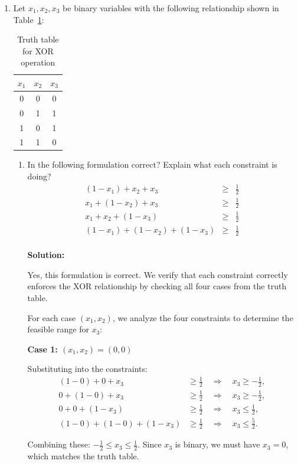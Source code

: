 \documentclass{article}
\begin{document}
\begin{enumerate}
 \item Let $x_1, x_2, x_3$ be binary variables with the following relationship shown in Table~\ref{tab:xor}:
 \begin{table}[h!]
\centering
\begin{tabular}{|c|c|c|}
\hline
\( x_1 \) & \( x_2 \) & \( x_3  \) \\
\hline
0 & 0 & 0 \\
0 & 1 & 1 \\
1 & 0 & 1 \\
1 & 1 & 0 \\
\hline
\end{tabular}
\caption{Truth table for XOR operation}
\label{tab:xor}
\end{table}
\begin{enumerate}
\item In the following formulation correct? Explain what each constraint is doing?
\begin{eqnarray*}
(1 - x_1) + x_2 + x_3 &\geq & \frac{1}{2}\\
x_1 + (1 - x_2) + x_3 &\geq & \frac{1}{2}\\
x_1 + x_2 + (1 - x_3) & \geq & \frac{1}{2}\\
(1 - x_1) + (1 - x_2) + (1 - x_3) &\geq& \frac{1}{2}\\
\end{eqnarray*}

\textbf{Solution:}

Yes, this formulation is correct. We verify that each constraint correctly enforces the XOR relationship by checking all four cases from the truth table.

For each case $(x_1, x_2)$, we analyze the four constraints to determine the feasible range for $x_3$:

\textbf{Case 1: $(x_1, x_2) = (0, 0)$}

Substituting into the constraints:
\begin{align*}
(1 - 0) + 0 + x_3 &\geq \frac{1}{2} \quad \Rightarrow \quad x_3 \geq -\frac{1}{2}, \\
0 + (1 - 0) + x_3 &\geq \frac{1}{2} \quad \Rightarrow \quad x_3 \geq -\frac{1}{2}, \\
0 + 0 + (1 - x_3) &\geq \frac{1}{2} \quad \Rightarrow \quad x_3 \leq \frac{1}{2}, \\
(1 - 0) + (1 - 0) + (1 - x_3) &\geq \frac{1}{2} \quad \Rightarrow \quad x_3 \leq \frac{5}{2}.
\end{align*}

Combining these: $-\frac{1}{2} \leq x_3 \leq \frac{1}{2}$. Since $x_3$ is binary, we must have $x_3 = 0$, which matches the truth table.


\end{enumerate}
\end{enumerate}
\end{document}

